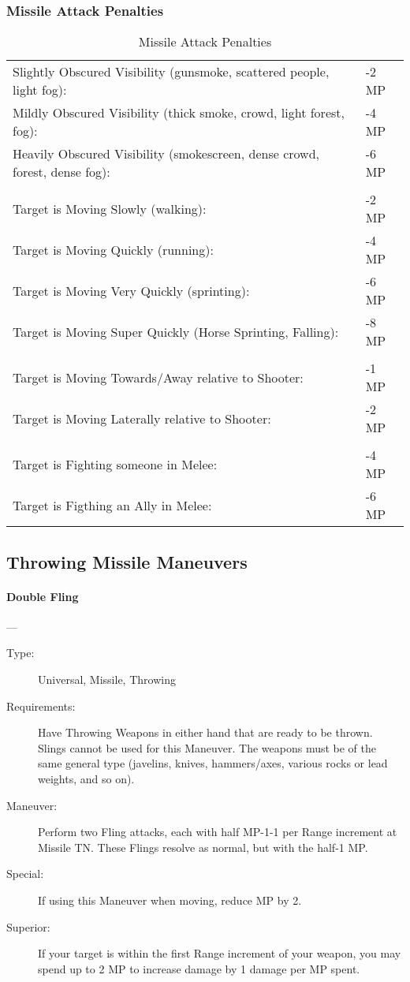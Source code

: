 \documentclass[oneside,11pt,english]{book}
\begin{document}
\subsubsection{Missile Attack Penalties}
\begin{table}[!ht]
	\caption{Missile Attack Penalties}
	\label{tab:Missile Attack Penalties}
	\begin{tabu} spread 0pt {X[5,L]X[-1,r]}
Slightly Obscured Visibility (gunsmoke, scattered people, light fog):& -2 MP \\
Mildly Obscured Visibility (thick smoke, crowd, light forest, fog):& -4 MP \\
Heavily Obscured Visibility (smokescreen, dense crowd, forest, dense fog):& -6 MP \\
	\\
Target is Moving Slowly (walking):& -2 MP \\
Target is Moving Quickly (running):& -4 MP \\
Target is Moving Very Quickly (sprinting):& -6 MP \\
Target is Moving Super Quickly (Horse Sprinting, Falling):& -8 MP \\
	\\
Target is Moving Towards/Away relative to Shooter:& -1 MP \\
Target is Moving Laterally relative to Shooter:& -2 MP \\
	\\
Target is Fighting someone in Melee:& -4 MP \\
Target is Figthing an Ally in Melee:& -6 MP \\
	\end{tabu}
\end{table}

\subsection{Throwing Missile Maneuvers}
\paragraph{\large\label{man:Double Fling}Double Fling}---\quad{\large[???????]}
\vspace{-10pt}\begin{description} 
\item [Type:] Universal, Missile, Throwing 
\item [Requirements:] Have Throwing Weapons in either hand that are ready to be thrown. Slings cannot be 
used for this Maneuver. The weapons must be of the same general type (javelins, knives, hammers/axes, 
various rocks or lead weights, and so on). 
\item [Maneuver:] Perform two Fling attacks, each with half MP-1-1 per Range increment at Missile TN. These 
Flings resolve as normal, but with the half-1 MP. 
\item [Special:] If using this Maneuver when moving, reduce MP by 2. 
\item [Superior:] If your target is within the first Range increment of your weapon, you may spend up to 2 MP to 
increase damage by 1 damage per MP spent. 
\end{description}
\end{document}
